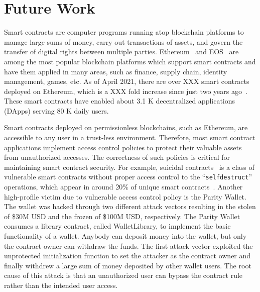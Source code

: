\chapter{Future Work}
\label{ch:futurework}



Smart contracts are computer programs running atop blockchain platforms to manage large sums of
money, carry out transactions of assets, and govern the transfer of digital rights between multiple
parties.
Ethereum~\cite{Ethereum} and EOS~\cite{EOS} are among the most popular blockchain platforms which
support smart contracts and have them applied in many areas, such as finance, supply chain,
identity management, games, etc.
As of April 2021, there are over XXX smart contracts deployed on Ethereum, which is a XXX fold
increase since just two years ago~\cite{Etherscan}.
These smart contracts have enabled about 3.1 K decentralized applications (DApps) serving 80 K
daily users.


Smart contracts deployed on permissionless blockchains, such as Ethereum, are accessible to any
user in a trust-less environment.
Therefore, most smart contract applications implement access control policies to protect their
valuable assets from unauthorized accesses.
The correctness of such policies is critical for maintaining smart contract security.
For example, suicidal contracts~\cite{nikolic2018finding} is a class of vulnerable smart contracts
without proper access control to the ``\texttt{selfdestruct}'' operations, which appear in around
20\% of unique smart contracts~\cite{oyente}.
Another high-profile victim due to vulnerable access control policy is the Parity Wallet.
The wallet was hacked through two different attack vectors resulting in the stolen of \$30M USD and
the frozen of \$100M USD, respectively.
The Parity Wallet consumes a library contract, called WalletLibrary, to implement the basic
functionality of a wallet.
Anybody can deposit money into the wallet, but only the contract owner can withdraw the funds.
The first attack vector exploited the unprotected initialization function to set the attacker as
the contract owner and finally withdrew a large sum of money deposited by other wallet users.
The root cause of this attack is that an unauthorized user can bypass the contract rule rather than
the intended user access.

